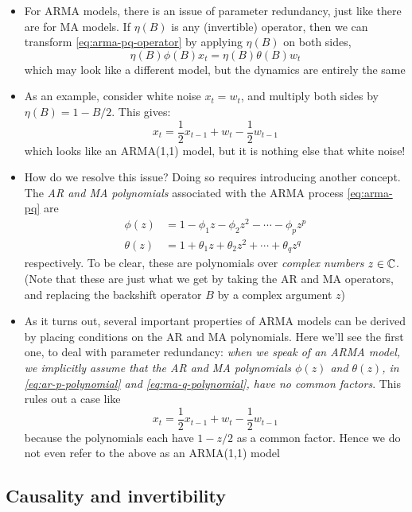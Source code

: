 \documentclass{article}
\begin{document}
\begin{itemize}
\item For ARMA models, there is an issue of parameter redundancy, just like
  there are for MA models. If $\eta(B)$ is any (invertible) operator, then we
  can transform \eqref{eq:arma-pq-operator} by applying $\eta(B)$ on both sides,  
  \[
  \eta(B) \phi(B) x_t = \eta(B) \theta(B) w_t  
  \]
  which may look like a different model, but the dynamics are entirely the
  same  

\item As an example, consider white noise $x_t = w_t$, and multiply both sides
  by $\eta(B) = 1 - B/2$. This gives:
  \[
  x_t = \frac{1}{2} x_{t-1} + w_t - \frac{1}{2} w_{t-1}
  \]
  which looks like an ARMA(1,1) model, but it is nothing else that white noise!
 
\item How do we resolve this issue? Doing so requires introducing another
  concept. The \emph{AR and MA polynomials} associated with the ARMA process
  \eqref{eq:arma-pq} are 
  \begin{align}
  \label{eq:ar-p-polynomial}
  \phi(z) &= 1 - \phi_1 z - \phi_2 z^2 - \cdots - \phi_p z^p \\
  \label{eq:ma-q-polynomial}
  \theta(z) &= 1 + \theta_1 z + \theta_2 z^2 + \cdots + \theta_q z^q
  \end{align}
  respectively. To be clear, these are polynomials over \emph{complex numbers}
  $z \in \mathbb{C}$. (Note that these are just what we get by taking the AR and MA
  operators, and replacing the backshift operator $B$ by a complex argument $z$) 

\item As it turns out, several important properties of ARMA models can be 
  derived by placing conditions on the AR and MA polynomials. Here we'll see the
  first one, to deal with parameter redundancy: \emph{when we speak of an ARMA
    model, we implicitly assume that the AR and MA polynomials $\phi(z)$ and
    $\theta(z)$, in \eqref{eq:ar-p-polynomial} and \eqref{eq:ma-q-polynomial},
    have no common factors}. This rules out a case like   
  \[
  x_t = \frac{1}{2} x_{t-1} + w_t - \frac{1}{2} w_{t-1}
  \]
  because the polynomials each have $1-z/2$ as a common factor. Hence we do not  
  even refer to the above as an ARMA(1,1) model
\end{itemize}

\subsection{Causality and invertibility}
\end{document}
